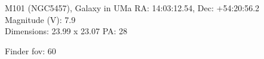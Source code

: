 \begin{block}{M101 (NGC5457), Galaxy in UMa}
    RA: 14:03:12.54, Dec: +54:20:56.2 \\ 
    Magnitude (V): 7.9 \\ 
    Dimensions: 23.99 x 23.07 PA: 28 

    Finder fov: 60 
\end{block}